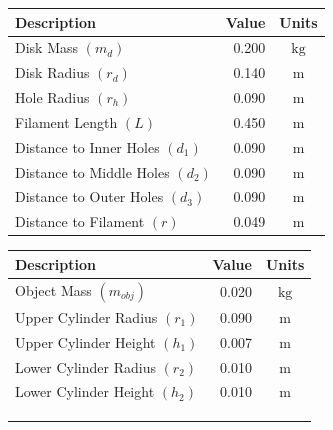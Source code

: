 \documentclass[a4paper]{article}
\begin{document}
\begin{figure}[h]
	\centering
	\begin{minipage}{0.45\textwidth}
		\centering
		\small
		\begin{tabular}{lrc}
			\toprule
			Description & Value & Units \\
			\midrule
			Disk Mass $(m_d)$ & 0.200 & $\si{\kilogram}$\\
			Disk Radius $(r_d)$ & 0.140 & $\si{\meter}$ \\
			Hole Radius $(r_h)$ & 0.090 & $\si{\meter}$ \\
			Filament Length $(L)$ & 0.450 & $\si{\meter}$ \\
			Distance to Inner Holes $(d_1)$ & 0.090 & $\si{\meter}$\\
			Distance to Middle Holes $(d_2)$ & 0.090 & $\si{\meter}$\\
			Distance to Outer Holes $(d_3)$ & 0.090 & $\si{\meter}$\\
			Distance to Filament $(r)$ & 0.049 & $\si{\meter}$ \\
			\bottomrule
		\end{tabular}
	\end{minipage}
	\hspace{1cm}
	\begin{minipage}{0.45\textwidth}
		\centering
		\small
		\begin{tabular}{lrc}
			\toprule
			Description & Value & Units \\
			\midrule
			Object Mass $(m_{obj})$ & 0.020 & $\si{\kilogram}$ \\
			Upper Cylinder Radius $(r_1)$ & 0.090 & $\si{\meter}$ \\
			Upper Cylinder Height $(h_1)$ & 0.007 & $\si{\meter}$ \\
			Lower Cylinder Radius $(r_2)$ & 0.010 & $\si{\meter}$ \\
			Lower Cylinder Height $(h_2)$ & 0.010 & $\si{\meter}$ \\
			 & & \\
			 & & \\
			 & & \\
			\bottomrule
		\end{tabular}
	\end{minipage}
\end{figure}
\end{document}
